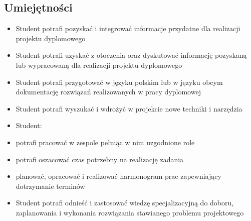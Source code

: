 \documentclass[12pt, a4paper]{article}
\begin{document}
\subsection*{Umiejętności}
\begin{itemize}
  \item Student potrafi pozyskać i integrować informacje przydatne dla realizacji projektu dyplomowego
  \item Student potrafi uzyskać z otoczenia oraz dyskutować informację pozyskaną lub wypracowaną dla realizacji projektu dyplomowego
  \item Student potrafi przygotować w języku polskim lub w języku obcym dokumentację rozwiązań realizowanych w pracy dyplomowej
  \item Student potrafi wyszukać i wdrożyć w projekcie nowe techniki i narzędzia
  \item Student:
  \item potrafi pracować w zespole pełniąc w nim uzgodnione role
  \item potrafi oszacować czas potrzebny na realizację zadania
  \item planować, opracować i realizować harmonogram prac zapewniający dotrzymanie terminów
  \item Student potrafi odnieść i zastosować wiedzę specjalizacyjną do doboru, zaplanowania i wykonania rozwiązania stawianego problemu projektowego
\end{itemize}
\end{document}
